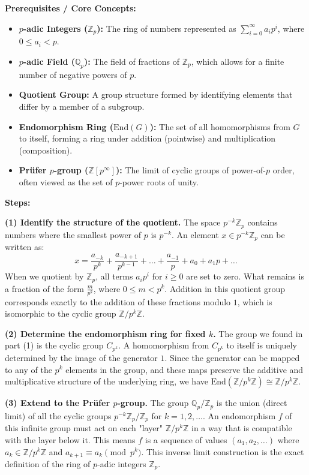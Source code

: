 \begin{solution}
\textbf{Prerequisites / Core Concepts:}
\begin{itemize}
    \item \textbf{$p$-adic Integers ($\mathbb{Z}_p$):} The ring of numbers represented as $\sum_{i=0}^\infty a_i p^i$, where $0 \leq a_i < p$.
    \item \textbf{$p$-adic Field ($\mathbb{Q}_p$):} The field of fractions of $\mathbb{Z}_p$, which allows for a finite number of negative powers of $p$.
    \item \textbf{Quotient Group:} A group structure formed by identifying elements that differ by a member of a subgroup.
    \item \textbf{Endomorphism Ring ($\text{End}(G)$):} The set of all homomorphisms from $G$ to itself, forming a ring under addition (pointwise) and multiplication (composition).
    \item \textbf{Prüfer $p$-group ($\mathbb{Z}[p^\infty]$):} The limit of cyclic groups of power-of-$p$ order, often viewed as the set of $p$-power roots of unity.
\end{itemize}

\textbf{Steps:}

\textbf{(1) Identify the structure of the quotient.}
The space $p^{-k}\mathbb{Z}_p$ contains numbers where the smallest power of $p$ is $p^{-k}$.
An element $x \in p^{-k}\mathbb{Z}_p$ can be written as:
\[ x = \frac{a_{-k}}{p^k} + \frac{a_{-k+1}}{p^{k-1}} + \dots + \frac{a_{-1}}{p} + a_0 + a_1 p + \dots \]
When we quotient by $\mathbb{Z}_p$, all terms $a_i p^i$ for $i \geq 0$ are set to zero.
What remains is a fraction of the form $\frac{m}{p^k}$, where $0 \leq m < p^k$.
Addition in this quotient group corresponds exactly to the addition of these fractions modulo $1$, which is isomorphic to the cyclic group $\mathbb{Z}/p^k\mathbb{Z}$.

\textbf{(2) Determine the endomorphism ring for fixed $k$.}
The group we found in part (1) is the cyclic group $C_{p^k}$.
A homomorphism from $C_{p^k}$ to itself is uniquely determined by the image of the generator $1$.
Since the generator can be mapped to any of the $p^k$ elements in the group, and these maps preserve the additive and multiplicative structure of the underlying ring, we have $\text{End}(\mathbb{Z}/p^k\mathbb{Z}) \cong \mathbb{Z}/p^k\mathbb{Z}$.

\textbf{(3) Extend to the Prüfer $p$-group.}
The group $\mathbb{Q}_p / \mathbb{Z}_p$ is the union (direct limit) of all the cyclic groups $p^{-k}\mathbb{Z}_p / \mathbb{Z}_p$ for $k = 1, 2, \dots$.
An endomorphism $f$ of this infinite group must act on each "layer" $\mathbb{Z}/p^k\mathbb{Z}$ in a way that is compatible with the layer below it.
This means $f$ is a sequence of values $(a_1, a_2, \dots)$ where $a_k \in \mathbb{Z}/p^k\mathbb{Z}$ and $a_{k+1} \equiv a_k \pmod{p^k}$.
This inverse limit construction is the exact definition of the ring of $p$-adic integers $\mathbb{Z}_p$.


\end{solution}
